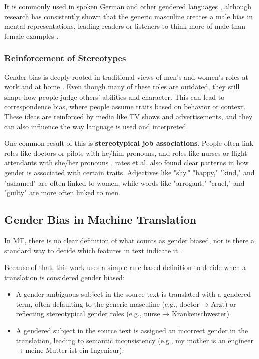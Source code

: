        It is commonly used in spoken German and other gendered languages \citep{lardelliBuildingBridgesDataset2024,schmitzGermanAllProfessors2022}, although research has consistently shown that the generic masculine creates a male bias in mental representations, leading readers or listeners to think more of male than female examples \citep{sczesnyCanGenderFairLanguage2016}. 

    \subsubsection{Reinforcement of Stereotypes}
        Gender bias is deeply rooted in traditional views of men’s and women’s roles at work and at home \citep{godsilEffectsGenderRoles2016}. Even though many of these roles are outdated, they still shape how people judge others’ abilities and character. This can lead to correspondence bias, where people assume traits based on behavior or context. These ideas are reinforced by media like TV shows and advertisements, and they can also influence the way language is used and interpreted.

        One common result of this is \textbf{stereotypical job associations}. People often link roles like doctors or pilots with he/him pronouns, and roles like nurses or flight attendants with she/her pronouns \citep{shresthaExploringGenderBiases2022}. \citet{pratesAssessingGenderBias2019} rates et al. also found clear patterns in how gender is associated with certain traits. Adjectives like "shy," "happy," "kind," and "ashamed" are often linked to women, while words like "arrogant," "cruel," and "guilty" are more often linked to men. 

  
 \subsection{Gender Bias in Machine Translation} \label{subsection:definition_gb}
    In MT, there is no clear definition of what counts as gender biased, nor is there a standard way to decide which features in text indicate it \citep{barclayInvestigatingMarkersDrivers2024a}.

    Because of that, this work uses a simple rule-based definition to decide when a translation is considered gender biased:
        \begin{itemize}
        \item A gender-ambiguous subject in the source text is translated with a gendered term, often defaulting to the generic masculine (e.g., doctor → Arzt) or reflecting stereotypical gender roles (e.g., nurse → Krankenschwester).
        \item A gendered subject in the source text is assigned an incorrect gender in the translation, leading to semantic inconsistency (e.g., my mother is an engineer → meine Mutter ist ein Ingenieur).
        \end{itemize}

